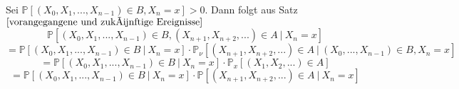 Sei $\mathbb{P}[(X_{0},X_{1},...,X_{n-1}) \in  B, X_{n} = x] > 0$. Dann folgt aus Satz $\ref{vorangegangene und zukünftige Ereignisse}$ 
\begin{equation*}
\mathbb{P}[(X_{0},X_{1},...,X_{n-1}) \in  B, (X_{n+1}, X_{n+2},...) \in A \: | \: X_{n} = x]
\end{equation*}
\begin{equation*}
= \mathbb{P}[(X_{0},X_{1},...,X_{n-1}) \in  B \: | \: X_{n} = x] \cdot \mathbb{P}_{\nu}[(X_{n+1}, X_{n+2},...) \in A \: | \: (X_{0},...,X_{n-1}) \in B, X_{n} = x]
\end{equation*}
\begin{equation*}
= \mathbb{P}[(X_{0},X_{1},...,X_{n-1}) \in  B \: | \: X_{n} = x] \cdot \mathbb{P}_{x}[(X_{1}, X_{2},...) \in A]
\end{equation*}
\begin{equation*}
= \mathbb{P}[(X_{0},X_{1},...,X_{n-1}) \in  B \: | \: X_{n} = x] \cdot \mathbb{P}[(X_{n+1}, X_{n+2},...) \in A \: | \: X_{n} = x]
\end{equation*}
